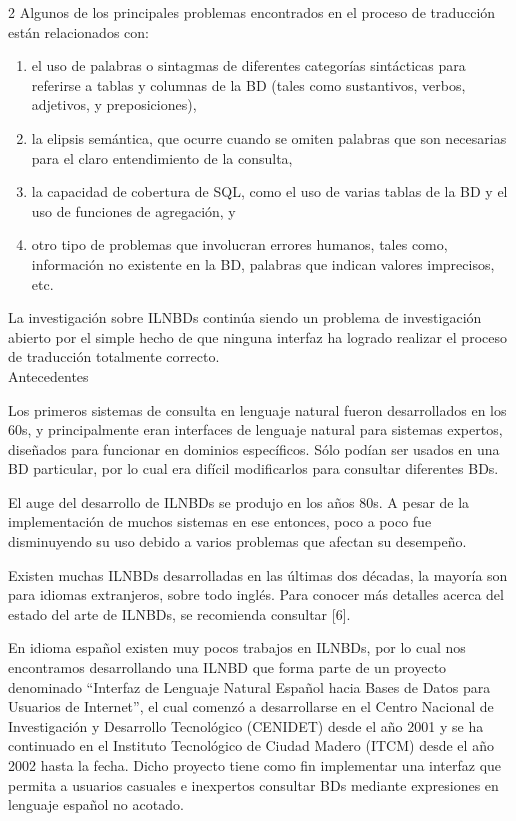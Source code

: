 \documentclass[letterpaper,10pt,final,hyphenatedtitles]{papertexKS}
\begin{document}
\begin{news}{2}
Algunos de los principales problemas encontrados en el proceso de traducción están relacionados con:
\begin{enumerate}
\item el uso de palabras o sintagmas de diferentes categorías sintácticas para referirse a tablas y columnas de la BD (tales como sustantivos, verbos, adjetivos, y preposiciones),
\item la elipsis semántica, que ocurre cuando se omiten palabras que son necesarias para el claro entendimiento de la consulta,
\item la capacidad de cobertura de SQL, como el uso de varias tablas de la BD y el uso de funciones de agregación, y
\item  otro tipo de problemas que involucran errores humanos, tales como, información no existente en la BD, palabras que indican   valores imprecisos, etc.
\end{enumerate}
La investigación sobre ILNBDs continúa siendo un problema de investigación abierto por el simple hecho de que ninguna interfaz ha logrado realizar el proceso de traducción totalmente correcto.
\\
	
\noindent\textcolor{color}{\Large{Antecedentes}}

Los primeros sistemas de consulta en lenguaje natural fueron desarrollados en los  60s, y principalmente eran interfaces de lenguaje natural para sistemas expertos, diseñados para funcionar en dominios específicos. Sólo podían ser usados en una BD particular, por lo cual era difícil modificarlos para consultar diferentes BDs.
\begin{center}
\end{center}
El auge del desarrollo de ILNBDs se produjo en los años 80s. A pesar de la implementación de muchos sistemas en ese entonces, poco a poco fue disminuyendo su uso debido a varios problemas que afectan su desempeño.
	
Existen muchas ILNBDs desarrolladas en las últimas dos décadas, la mayoría son para idiomas extranjeros, sobre todo inglés. Para conocer más detalles acerca del estado del arte de ILNBDs, se recomienda consultar [6].
	
En idioma español existen muy pocos trabajos en ILNBDs, por lo cual nos encontramos desarrollando una ILNBD que forma parte de un proyecto denominado “Interfaz de Lenguaje Natural Español hacia Bases de Datos para Usuarios de Internet”, el cual comenzó a desarrollarse en el Centro Nacional de Investigación y Desarrollo Tecnológico (CENIDET) desde el año 2001 y se ha continuado en el Instituto Tecnológico de Ciudad Madero (ITCM) desde el año 2002 hasta la fecha. Dicho proyecto tiene como fin implementar una interfaz que permita a usuarios casuales e inexpertos consultar BDs mediante expresiones en lenguaje español no acotado. 


\end{news}
\end{document}
